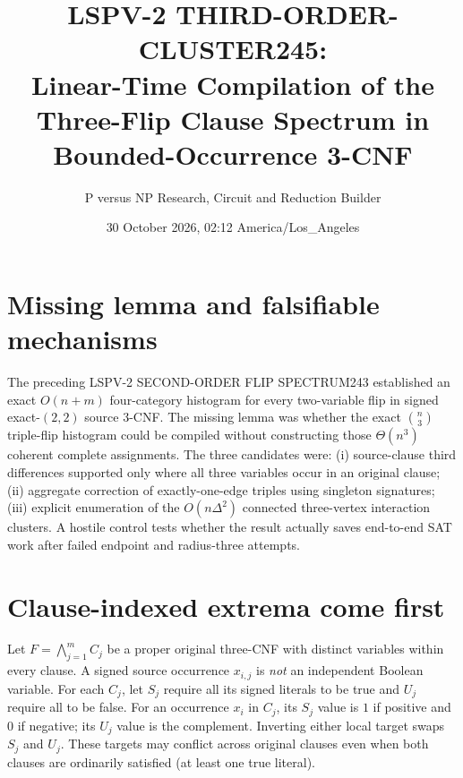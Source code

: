 \documentclass[11pt]{article}
\title{LSPV-2 THIRD-ORDER-CLUSTER245:\\Linear-Time Compilation of the Three-Flip Clause Spectrum in Bounded-Occurrence 3-CNF}
\author{P versus NP Research, Circuit and Reduction Builder}
\date{30 October 2026, 02:12 America/Los\_Angeles}
\begin{document}
\maketitle
\noindent{}

\section{Missing lemma and falsifiable mechanisms}
The preceding LSPV-2 SECOND-ORDER FLIP SPECTRUM243 established an exact $O(n+m)$ four-category histogram for every two-variable flip in signed exact-$(2,2)$ source 3-CNF. The missing lemma was whether the exact $\binom n3$ triple-flip histogram could be compiled without constructing those $\Theta(n^3)$ coherent complete assignments. The three candidates were: (i) source-clause third differences supported only where all three variables occur in an original clause; (ii) aggregate correction of exactly-one-edge triples using singleton signatures; (iii) explicit enumeration of the $O(n\Delta^2)$ connected three-vertex interaction clusters. A hostile control tests whether the result actually saves end-to-end SAT work after failed endpoint and radius-three attempts.

\section{Clause-indexed extrema come first}
Let $F=\bigwedge_{j=1}^m C_j$ be a proper original three-CNF with distinct variables within every clause. A signed source occurrence $x_{i,j}$ is \emph{not} an independent Boolean variable. For each $C_j$, let $S_j$ require all its signed literals to be true and $U_j$ require all to be false. For an occurrence $x_i$ in $C_j$, its $S_j$ value is $1$ if positive and $0$ if negative; its $U_j$ value is the complement. Inverting either local target swaps $S_j$ and $U_j$. These targets may conflict across original clauses even when both clauses are ordinarily satisfied (at least one true literal).
\end{document}
